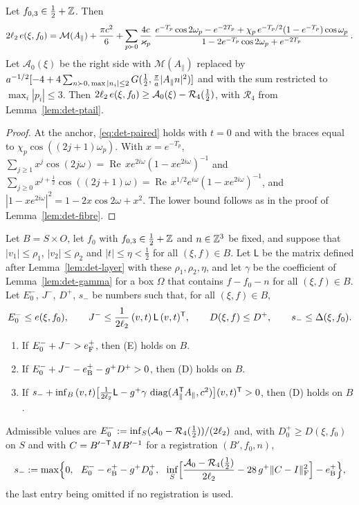 \begin{lemma}\label{lem:det-anchor}
Let $f_{0,3}\in\frac12+\mathbb Z$. Then
\begin{equation}\label{eq:det-anchor}
  2\ell_2\,e(\xi,f_0)=\mathcal M(A_\parallel)+\frac{\pi c^2}6+\sum_{p\succ0}\frac{4c}{\varkappa_p}\;
   \frac{e^{-T_p}\cos2\omega_p-e^{-2T_p}+\chi_p\,e^{-T_p/2}(1-e^{-T_p})\cos\omega_p}{1-2e^{-T_p}\cos2\omega_p+e^{-2T_p}}\,.
\end{equation}
Let $\mathcal A_0(\xi)$ be the right side with $\mathcal M(A_\parallel)$ replaced by
$a^{-1/2}[-4+4\sum_{n\succ0,\,\max|n_i|\le2}G(\frac12,\frac\pi a|A_\parallel n|^2)]$ and with the sum restricted to $\max_i|p_i|\le3$.
Then $2\ell_2\,e(\xi,f_0)\ge\mathcal A_0(\xi)-\mathcal R_4(\frac12)$, with $\mathcal R_4$ from Lemma~\ref{lem:det-ptail}.
\end{lemma}

\begin{proof}
At the anchor, \eqref{eq:det-paired} holds with $t=0$ and with the braces equal to $\chi_p\cos((2j+1)\omega_p)$. With $x=e^{-T_p}$,
$\sum_{j\ge1}x^j\cos(2j\omega)=\operatorname{Re}\,xe^{2i\omega}(1-xe^{2i\omega})^{-1}$ and
$\sum_{j\ge0}x^{j+\frac12}\cos((2j+1)\omega)=\operatorname{Re}\,x^{1/2}e^{i\omega}(1-xe^{2i\omega})^{-1}$, and
$|1-xe^{2i\omega}|^2=1-2x\cos2\omega+x^2$. The lower bound follows as in the proof of Lemma~\ref{lem:det-fibre}.
\end{proof}

\begin{lemma}\label{lem:det-centred}
Let $B=S\times O$, let $f_0$ with $f_{0,3}\in\frac12+\mathbb Z$ and $n\in\mathbb Z^3$ be fixed, and suppose that $|v_1|\le\rho_1$,
$|v_2|\le\rho_2$ and $|t|\le\eta<\frac12$ for all $(\xi,f)\in B$. Let $\mathsf L$ be the matrix defined after
Lemma~\ref{lem:det-layer} with these $\rho_1,\rho_2,\eta$, and let $\gamma$ be the coefficient of Lemma~\ref{lem:det-gamma} for a
box $\Omega$ that contains $f-f_0-n$ for all $(\xi,f)\in B$. Let $E_0^-$, $J^-$, $D^+$, $s_-$ be numbers such that, for all
$(\xi,f)\in B$,
\[
  E_0^-\le e(\xi,f_0),\qquad J^-\le\frac1{2\ell_2}\,(v,t)\,\mathsf L\,(v,t)^\mathsf T,\qquad D(\xi,f)\le D^+,\qquad s_-\le\Delta(\xi,f_0).
\]
\begin{enumerate}
\item[\textup{(i)}] If $E_0^-+J^->e_{\mathrm F}^+$, then \textup{(E)} holds on $B$.
\item[\textup{(ii)}] If $E_0^-+J^--e_{\mathrm B}^+-g^+D^+>0$, then \textup{(D)} holds on $B$.
\item[\textup{(iii)}] If $s_-+\inf_B\,(v,t)\bigl[\frac1{2\ell_2}\mathsf L-g^+\gamma\,\operatorname{diag}(A_\parallel^\mathsf T A_\parallel,c^2)\bigr](v,t)^\mathsf T>0$, then
\textup{(D)} holds on $B$.
\end{enumerate}
Admissible values are $E_0^-:=\inf_S(\mathcal A_0-\mathcal R_4(\frac12))/(2\ell_2)$ and, with $D_0^+\ge D(\xi,f_0)$ on $S$ and with
$C=B'^{-\mathsf T}MB'^{-1}$ for a registration $(B',f_0,n)$,
\[
  s_-:=\max\Bigl\{0,\ \ E_0^--\eB^+-\gap^+D_0^+,\ \ \inf_S\Bigl[\frac{\mathcal A_0-\mathcal R_4(\frac12)}{2\ltwo}-28\,\gap^+\|C-I\|_\Fro^2\Bigr]-\eB^+\Bigr\},
\]
the last entry being omitted if no registration is used.
\end{lemma}

